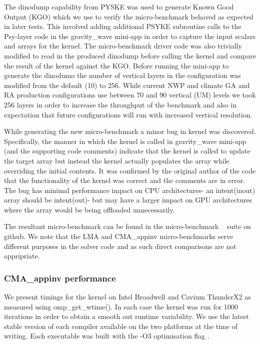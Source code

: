 The dinodump capability from PYSKE was used to generate Known Good Output (KGO) which we use to verify the micro-benchmark behaved as expected in later tests.
This involved adding additional PSYKE subroutine calls to the Psy-layer code in the gravity\_wave mini-app in order to capture the input scalars and arrays for the kernel.
The micro-benchmark driver code was also trivially modified to read in the produced dinodump before calling the kernel and compare the result of the kernel against the KGO.
Before running the mini-app to generate the dinodumo the number of vertical layers in the configuration was modified from the default (10) to 256.
While current NWP and climate GA and RA production configurations use between 70 and 90 vertical (UM) levels we took 256 layers in order to increase the throughput of the benchmark and also in expectation that future configurations will run with increased vertical resolution.


While generating the new micro-benchmark a minor bug in kernel was discovered.
Specifically, the manner in which the kernel is called in gravity\_wave mini-app (and the supporting code comments) indicate that the kernel is called to update the target array but instead the kernel actually populates the array while overriding the initial contents.
It was confirmed by the original author of the code that the functionality of the kernel was correct and the comments are in error.
The bug has minimal performance impact on CPU architectures- an intent(inout) array should be intent(out)- but may have a larger impact on GPU architectures where the array would be being offloaded unnecessarily. 

The resultant micro-benchmark can be found in the micro-benchmark ~\cite{lfric-microbenchmarks} suite on github.
We note that the LMA and CMA\_appinv micro-benchmarks serve different purposes in the solver code and as such direct comparisons are not appripriate.

\subsubsection{CMA\_appinv performance}

We present timings for the kernel on Intel Broadwell and Cavium ThunderX2 as measured using omp\_get\_wtime().
In each case the kernel was run for 1000 iterations in order to obtain a smooth out runtime variability.
We use the latest stable version of each compiler available on the two platforms at the time of writing.
Each executable was built with the -O3 optimisation flag .

